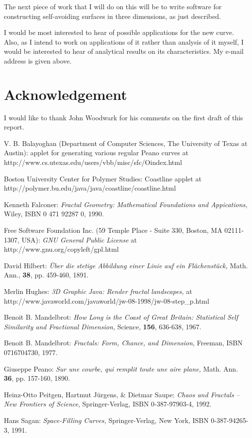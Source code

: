 \documentclass[12pt]{article}
\begin{document}
The next piece of work that I will do on this will be to write
software for constructing self-avoiding surfaces in three dimensions,
as just described.

\vspace{5mm}

\noindent
I would be most interested to hear of possible applications for the
new curve.  Also, as I intend to work on applications of it rather than
analysis of it myself, I would be interested to hear of analytical
results on its characteristics.  My e-mail address is given above.

\section*{Acknowledgement}

I would like to thank John Woodwark for his comments on the
first draft of this report.

\begin{thebibliography}{99}

 V. B. Balayoghan (Department of Computer
Sciences, The University of Texas at Austin): applet for generating
various regular Peano curves at
http://www.cs.utexas.edu/users/vbb/misc/sfc/Oindex.html

 Boston University
Center for Polymer Studies:  Coastline applet at
http://polymer.bu.edu/java/java/coastline/coastline.html

 Kenneth Falconer: {\em Fractal Geometry:
Mathematical Foundations and Appications,} Wiley, ISBN 0 471 92287 0, 1990.

 Free Software Foundation Inc.  (59 Temple Place - Suite
330, Boston, MA 02111-1307, USA): {\em GNU General Public License} at
http://www.gnu.org/copyleft/gpl.html

 David Hilbert: {\em \"{U}ber die stetige Abbildung
einer Linie auf ein Fl\"{a}chenst\"{u}ck,} Math. Ann.,
{\bf 38}, pp. 459-460, 1891.

Merlin Hughes: {\em 3D Graphic Java: Render fractal
landscapes,} at
http://www.javaworld.com/javaworld/jw-08-1998/jw-08-step\_p.html

 Benoit B. Mandelbrot: {\em How Long is the Coast of
Great Britain: Statistical Self Similarity and Fractional Dimension,}
Science, {\bf 156}, 636-638, 1967.

 Benoit B. Mandelbrot: {\em Fractals: Form, Chance, and
Dimension}, Freeman, ISBN 0716704730, 1977.

 Giuseppe Peano: {\em Sur une courbe, qui remplit
toute une aire plane,} Math. Ann. {\bf 36}, pp. 157-160, 1890.

Heinz-Otto Peitgen, Hartmut J\"{u}rgens, \& Dietmar
Saupe: {\em Chaos and Fractals -- New Frontiers of Science},
Springer-Verlag, ISBN 0-387-97903-4, 1992.

 Hans Sagan: {\em Space-Filling Curves,} Springer-Verlag, New
York, ISBN 0-387-94265-3, 1991.

\end{thebibliography}
\end{document}
